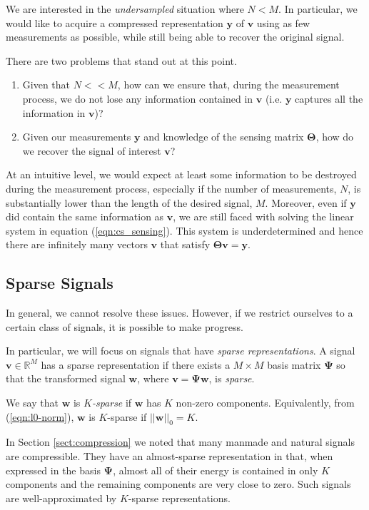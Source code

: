 We are interested in the \emph{undersampled} situation where $N < M$.
In particular, we would like to acquire a compressed representation $\bm y$ of $\bm v$ using as few measurements as possible, while still being able to recover the original signal.

There are two problems that stand out at this point. 
\begin{enumerate}
\item Given that $N << M$, how can we ensure that, during the measurement process, we do not lose any information contained in $\bm v$ (i.e. $\bm y$ captures all the information in $\bm v$)?
\item Given our measurements $\bm y$ and knowledge of the sensing matrix $\bm\Theta$, how do we recover the signal of interest $\bm v$?
\end{enumerate}

At an intuitive level, we would expect at least some information to be destroyed during the measurement process, especially if the number of measurements, $N$, is substantially lower than the length of the desired signal, $M$.
Moreover, even if $\bm y$ did contain the same information as $\bm v$, we are still faced with solving the linear system in equation (\ref{eqn:cs_sensing}).
This system is underdetermined and hence there are infinitely many vectors $\bm v$ that satisfy $\bm\Theta\bm v=\bm y$. 

\subsection{Sparse Signals}
In general, we cannot resolve these issues.
However, if we restrict ourselves to a certain class of signals, it is possible to make progress.

In particular, we will focus on signals that have \emph{sparse representations}.
A signal $\bm v \in\mathbb{R}^M$ has a sparse representation if there exists a $M\times M$ basis matrix $\bm\Psi$ so that the transformed signal $\bm w$, where $\bm v = \bm\Psi\bm w$, is \emph{sparse}.

We say that $\bm w$ is \emph{$K$-sparse} if $\bm w$ has $K$ non-zero components.
Equivalently, from (\ref{eqn:l0-norm}), $\bm w$ is $K$-sparse if $||\bm w||_0 = K$.

In Section \ref{sect:compression} we noted that many manmade and natural signals are compressible.
They have an almost-sparse representation in that, when expressed in the basis $\bm\Psi$, almost all of their energy is contained in only $K$ components and the remaining components are very close to zero.
Such signals are well-approximated by $K$-sparse representations.

